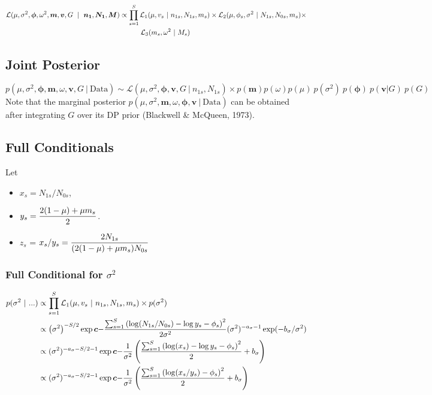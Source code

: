 \documentclass[12pt]{article}
\newcommand{\bc}{\mbox{\boldmath $c$}}
\begin{document}
\begin{align*}
  \mathcal{L}(\mu,\sigma^2,\bm{\phi},\omega^2,\bm{m},\bm{v},G~\mid~ \bm{n_{1}},\bm{N_{1}},\bm{M}) &\propto \displaystyle\prod_{s=1}^S \mathcal{L}_1(\mu,v_s~|~n_{1s},N_{1s},m_{s}) \times \mathcal{L}_2(\mu,\phi_s,\sigma^2~|~N_{1s},N_{0s},m_{s}) \times \\ 
              &\hspace{3em}\mathcal{L}_3(m_s,\omega^2~|~M_{s})
\end{align*}


\subsection{Joint Posterior}
$$
p(\mu,\sigma^2, \bm\phi, \bm{m}, \omega, \bm v, G ~|~ \text{Data}) \sim \mathcal{L}(\mu,\sigma^2,\bm\phi,\bm v,G~|~n_{1s},N_{1s}) \times p(\bm{m})p(\omega)p(\mu)~p(\sigma^2)~p(\bm\phi)~p(\bm v|G)~p(G)
$$
Note that the marginal posterior $p(\mu,\sigma^2, \bm{m},\omega,\bm\phi,\bm v ~|~
\text{Data})$ can be obtained after integrating $G$ over its DP prior
(Blackwell \& McQueen, 1973).

\subsection{Full Conditionals}
Let 
\begin{itemize}
  \item $x_s = N_{1s}/N_{0s}$, \\
  \item $y_s = \displaystyle\frac{2(1-\mu)+\mu m_s}{2}$.
  \item $z_s$ = $x_s / y_s = \displaystyle\frac{2N_{1s}}{ (2(1-\mu) +\mu m_s)N_{0s}}$
\end{itemize}

\subsubsection{Full Conditional for $\sigma^2$}
\begin{align*}
p(\sigma^2 ~|~ ...) &\propto \prod_{s=1}^S \LOne \times p(\sigma^2)\\
                    &\propto \p{\sigma^2}^{-S/2}\exp\bc{\ds-\frac{\sums\p{\log(N_{1s}/N_{0s})-\log y_s-\phi_s}^2}{2\sigma^2}} (\sigma^2)^{-a_\sigma-1} \exp(-b_\sigma/\sigma^2)\\
                    &\propto (\sigma^2)^{-a_\sigma-S/2-1} \exp\bc{-\frac{1}{\sigma^2}\p{\frac{\sums\p{\log(x_s)-\log y_s-\phi_s}^2}{2}+b_\sigma}}\\
                    &\propto (\sigma^2)^{-a_\sigma-S/2-1} \exp\bc{-\frac{1}{\sigma^2}\p{\frac{\sums\p{\log(x_s/y_s)-\phi_s}^2}{2}+b_\sigma}}\\
\end{align*}
\end{document}
